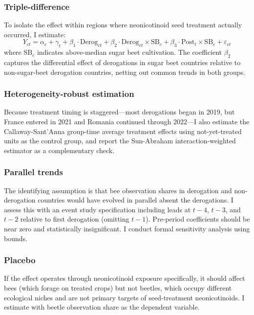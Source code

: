 \documentclass[12pt]{article}
\begin{document}
\subsubsection*{Triple-difference} To isolate the effect within regions where neonicotinoid seed treatment actually occurred, I estimate:
\begin{equation}
Y_{ct} = \alpha_c + \gamma_t + \beta_1 \cdot \text{Derog}_{ct} + \beta_2 \cdot \text{Derog}_{ct} \times \text{SB}_c + \beta_3 \cdot \text{Post}_t \times \text{SB}_c + \varepsilon_{ct}
\label{eq:ddd}
\end{equation}
where $\text{SB}_c$ indicates above-median sugar beet cultivation. The coefficient $\beta_2$ captures the differential effect of derogations in sugar beet countries relative to non-sugar-beet derogation countries, netting out common trends in both groups.

\subsubsection*{Heterogeneity-robust estimation} Because treatment timing is staggered---most derogations began in 2019, but France entered in 2021 and Romania continued through 2022---I also estimate the Callaway-Sant'Anna \citep{callaway2021} group-time average treatment effects using not-yet-treated units as the control group, and report the Sun-Abraham \citep{sun2021} interaction-weighted estimator as a complementary check.

\subsubsection*{Parallel trends} The identifying assumption is that bee observation shares in derogation and non-derogation countries would have evolved in parallel absent the derogations. I assess this with an event study specification including leads at $t-4$, $t-3$, and $t-2$ relative to first derogation (omitting $t-1$). Pre-period coefficients should be near zero and statistically insignificant. I conduct formal sensitivity analysis using \citet{rambachan2023} bounds.

\subsubsection*{Placebo} If the effect operates through neonicotinoid exposure specifically, it should affect bees (which forage on treated crops) but not beetles, which occupy different ecological niches and are not primary targets of seed-treatment neonicotinoids. I estimate  with beetle observation share as the dependent variable.
\end{document}
